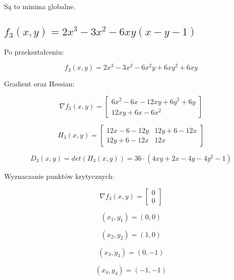 \documentclass{article}
\begin{document}
	Są to minima globalne.


	\subsection*{$f_3(x,y) = 2x^3 - 3x^2 - 6xy(x-y-1)$}

	Po przekształceniu:

	\begin{equation}
		f_3(x,y) = 2x^3-3x^2-6x^2y+6xy^2+6xy
	\end{equation}

	Gradient oraz Hessian:

	\begin{equation}
		\nabla f_3(x,y) = \begin{bmatrix} 6x^2-6x-12xy+6y^2+6y \\ 12xy+6x-6x^2 \end{bmatrix}
	\end{equation}

	\begin{equation}
		H_3(x,y) = \begin{bmatrix} 12x-6-12y & 12y+6-12x\\ 12y+6-12x & 12x\end{bmatrix}
	\end{equation}

	\begin{equation}
		D_3(x,y) = det(H_3(x,y)) = 36 \cdot (4xy+2x-4y-4y^2-1)
	\end{equation}

	\newpage

	Wyznaczanie punktów krytycznych:

	\begin{equation}
		\nabla f_3(x,y) = \begin{bmatrix} 0 \\ 0 \end{bmatrix}
	\end{equation}

	\begin{equation}
		(x_1,y_1) = (0,0)
	\end{equation}

	\begin{equation}
		(x_2,y_2) = (1,0)
	\end{equation}

	\begin{equation}
		(x_3,y_3) = (0,-1)
	\end{equation}

	\begin{equation}
		(x_4,y_4) = (-1,-1)
	\end{equation}
\end{document}
